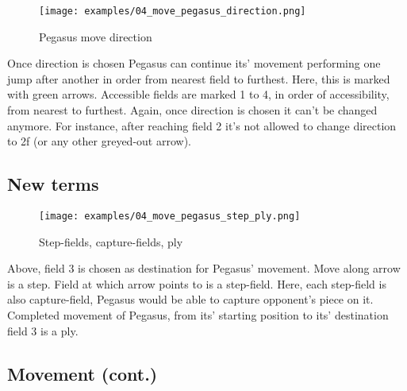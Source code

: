 \clearpage %

\noindent
\begin{figure}[!h]
\texttt{[image: examples/04\_move\_pegasus\_direction.png]}
\caption{Pegasus move direction}
\label{fig:04_move_pegasus_direction}
\end{figure}

Once direction is chosen Pegasus can continue its' movement performing one jump
after another in order from nearest field to furthest. Here, this is marked
with green arrows. Accessible fields are marked 1 to 4, in order of accessibility,
from nearest to furthest. Again, once direction is chosen it can't be changed anymore.
For instance, after reaching field 2 it's not allowed to change direction to 2f (or
any other greyed-out arrow).

\clearpage %

\subsection*{New terms}

\noindent
\begin{figure}[!h]
\vspace{-1.0\baselineskip}
\texttt{[image: examples/04\_move\_pegasus\_step\_ply.png]}
\caption{Step-fields, capture-fields, ply}
\label{fig:04_move_pegasus_step_ply}
\end{figure}

Above, field 3 is chosen as destination for Pegasus' movement. Move along arrow is a step.
Field at which arrow points to is a step-field. Here, each step-field is also capture-field,
Pegasus would be able to capture opponent's piece on it. Completed movement of Pegasus,
from its' starting position to its' destination field 3 is a ply.

\clearpage %

\subsection*{Movement (cont.)}

